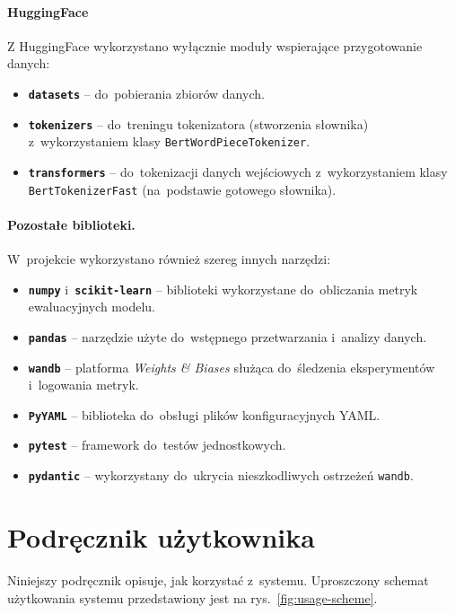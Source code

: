 \documentclass[a4paper,11pt,twoside]{report}
\theoremstyle{definition}
\begin{document}
\paragraph{HuggingFace}  
Z HuggingFace wykorzystano wyłącznie moduły wspierające przygotowanie danych:
\begin{itemize}
  \item \textbf{\texttt{datasets}} -- do~pobierania zbiorów danych.
  \item \textbf{\texttt{tokenizers}} -- do~treningu tokenizatora (stworzenia słownika) z~wykorzystaniem klasy \texttt{BertWordPieceTokenizer}.
  \item \textbf{\texttt{transformers}} -- do~tokenizacji danych wejściowych z~wykorzystaniem klasy \texttt{BertTokenizerFast} (na~podstawie gotowego słownika).
\end{itemize}

\paragraph{Pozostałe biblioteki.}  
W~projekcie wykorzystano również szereg innych narzędzi:
\begin{itemize}
  \item \textbf{\texttt{numpy}} i~\textbf{\texttt{scikit-learn}} -- biblioteki wykorzystane do~obliczania metryk ewaluacyjnych modelu.
  \item \textbf{\texttt{pandas}} -- narzędzie użyte do~wstępnego przetwarzania i~analizy danych.
  \item \textbf{\texttt{wandb}} -- platforma \textit{Weights \& Biases} służąca do~śledzenia eksperymentów i~logowania metryk.
  \item \textbf{\texttt{PyYAML}} -- biblioteka do~obsługi plików konfiguracyjnych YAML.
  \item \textbf{\texttt{pytest}} -- framework do~testów jednostkowych.
  \item \textbf{\texttt{pydantic}} -- wykorzystany do~ukrycia nieszkodliwych ostrzeżeń \texttt{wandb}.
\end{itemize}


\section{Podręcznik użytkownika}\label{sec:how-to-use}

Niniejszy podręcznik opisuje, jak korzystać z~systemu. Uproszczony schemat użytkowania systemu przedstawiony jest na rys.~\ref{fig:usage-scheme}.
\end{document}
